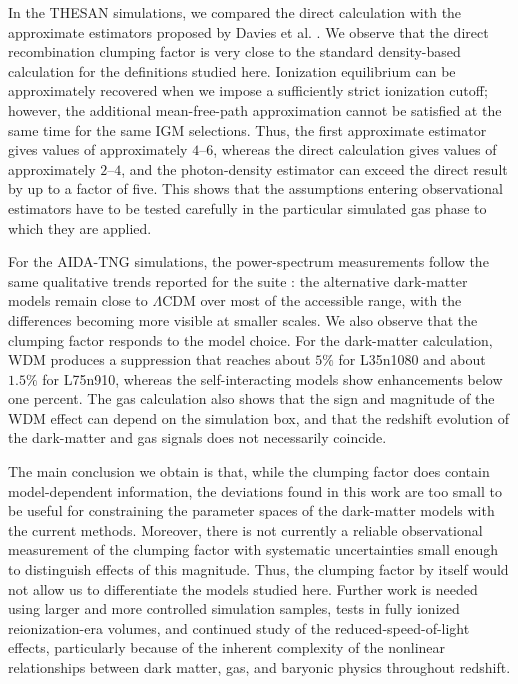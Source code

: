 \documentclass[%
 reprint,
nofootinbib,
 amsmath,amssymb,
 aps,
]{revtex4-2}
\begin{document}
In the THESAN simulations, we compared the direct calculation with the approximate estimators proposed by Davies et al. \cite{davies2024clumping}. We observe that the direct recombination clumping factor is very close to the standard density-based calculation for the definitions studied here. Ionization equilibrium can be approximately recovered when we impose a sufficiently strict ionization cutoff; however, the additional mean-free-path approximation cannot be satisfied at the same time for the same IGM selections. Thus, the first approximate estimator gives values of approximately $4$--$6$, whereas the direct calculation gives values of approximately $2$--$4$, and the photon-density estimator can exceed the direct result by up to a factor of five. This shows that the assumptions entering observational estimators have to be tested carefully in the particular simulated gas phase to which they are applied.

For the AIDA-TNG simulations, the power-spectrum measurements follow the same qualitative trends reported for the suite \cite{despali2025aidatng}: the alternative dark-matter models remain close to $\Lambda$CDM over most of the accessible range, with the differences becoming more visible at smaller scales. We also observe that the clumping factor responds to the model choice. For the dark-matter calculation, WDM produces a suppression that reaches about $5\%$ for L35n1080 and about $1.5\%$ for L75n910, whereas the self-interacting models show enhancements below one percent. The gas calculation also shows that the sign and magnitude of the WDM effect can depend on the simulation box, and that the redshift evolution of the dark-matter and gas signals does not necessarily coincide.

The main conclusion we obtain is that, while the clumping factor does contain model-dependent information, the deviations found in this work are too small to be useful for constraining the parameter spaces of the dark-matter models with the current methods. Moreover, there is not currently a reliable observational measurement of the clumping factor with systematic uncertainties small enough to distinguish effects of this magnitude. Thus, the clumping factor by itself would not allow us to differentiate the models studied here. Further work is needed using larger and more controlled simulation samples, tests in fully ionized reionization-era volumes, and continued study of the reduced-speed-of-light effects, particularly because of the inherent complexity of the nonlinear relationships between dark matter, gas, and baryonic physics throughout redshift.
\end{document}
